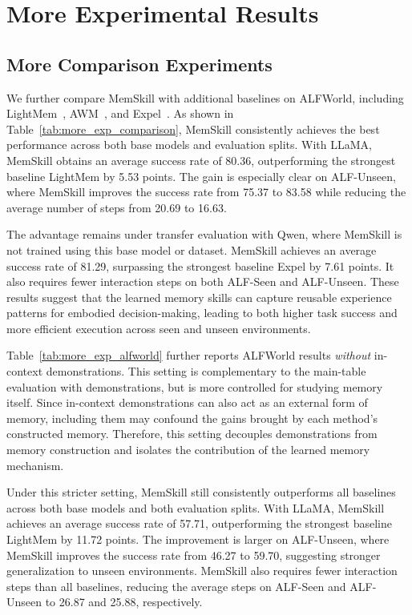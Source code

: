 \section{More Experimental Results}
\label{appendix:more_exp}


\subsection{More Comparison Experiments}
\label{appendix:more_exp_comparison}




We further compare MemSkill with additional baselines on ALFWorld, including LightMem~\citep{fang2025lightmem}, AWM~\citep{wang2024agent}, and Expel~\citep{zhao2024expel}. As shown in Table~\ref{tab:more_exp_comparison}, MemSkill consistently achieves the best performance across both base models and evaluation splits. With LLaMA, MemSkill obtains an average success rate of 80.36, outperforming the strongest baseline LightMem by 5.53 points. The gain is especially clear on ALF-Unseen, where MemSkill improves the success rate from 75.37 to 83.58 while reducing the average number of steps from 20.69 to 16.63.

The advantage remains under transfer evaluation with Qwen, where MemSkill is not trained using this base model or dataset. MemSkill achieves an average success rate of 81.29, surpassing the strongest baseline Expel by 7.61 points. It also requires fewer interaction steps on both ALF-Seen and ALF-Unseen. These results suggest that the learned memory skills can capture reusable experience patterns for embodied decision-making, leading to both higher task success and more efficient execution across seen and unseen environments.








Table~\ref{tab:more_exp_alfworld} further reports ALFWorld results \textit{without} in-context demonstrations. This setting is complementary to the main-table evaluation with demonstrations, but is more controlled for studying memory itself. Since in-context demonstrations can also act as an external form of memory, including them may confound the gains brought by each method's constructed memory. Therefore, this setting decouples demonstrations from memory construction and isolates the contribution of the learned memory mechanism.

Under this stricter setting, MemSkill still consistently outperforms all baselines across both base models and both evaluation splits. With LLaMA, MemSkill achieves an average success rate of 57.71, outperforming the strongest baseline LightMem by 11.72 points. The improvement is larger on ALF-Unseen, where MemSkill improves the success rate from 46.27 to 59.70, suggesting stronger generalization to unseen environments. MemSkill also requires fewer interaction steps than all baselines, reducing the average steps on ALF-Seen and ALF-Unseen to 26.87 and 25.88, respectively.

